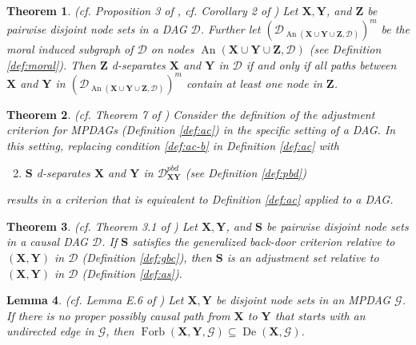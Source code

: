 \documentclass[twoside]{article}
\newtheorem{theorem}{Theorem}
\newtheorem{lemma}[theorem]{Lemma}
\DeclareMathOperator{\An}{An}
\DeclareMathOperator{\De}{De}
\DeclareMathOperator{\Forb}{Forb}
\newcommand{\fb}[2][X,Y]{\Forb(\mb{#1},#2)}
\newcommand{\dpbd}[2][G]{\mathcal{D}_{\mb{#2}}^{pbd}}
\newcommand{\mb}[1]{\mathbf{#1}}
\newcommand{\g}[1][G]{\mathcal{#1}}
\begin{document}


\begin{theorem}
\label{thm:richardson}
{\normalfont (cf. Proposition 3 of \cite{lauritzen1990independence}, cf. Corollary 2 of \cite{richardson2003markov})}
    Let $\mb{X},\mb{Y}$, and $\mb{Z}$ be pairwise disjoint node sets in a DAG $\g[D]$. Further let $(\g[D]_{\An(\mb{X} \cup \mb{Y} \cup \mb{Z},\g[D])})^m$ be the moral induced subgraph of $\g[D]$ on nodes $\An(\mb{X} \cup \mb{Y} \cup \mb{Z},\g[D])$ (see Definition \ref{def:moral}). Then $\mb{Z}$ d-separates $\mb{X}$ and $\mb{Y}$ in $\g[D]$ if and only if all paths between $\mb{X}$ and $\mb{Y}$ in $(\g[D]_{\An(\mb{X} \cup \mb{Y} \cup \mb{Z},\g[D])})^m$ contain at least one node in $\mb{Z}$.
\end{theorem}


\begin{theorem}
\label{thm:ac-alt}
{\normalfont (cf. Theorem 7 of \citealp{perkovic2018complete})}
    Consider the definition of the adjustment criterion for MPDAGs (Definition \ref{def:ac}) in the specific setting of a DAG. In this setting, replacing condition \ref{def:ac-b} in Definition \ref{def:ac} with
    \begin{enumerate}[label=\emph{(\alph*)}]
        \setcounter{enumi}{1}
        \item $\mb{S}$ d-separates $\mb{X}$ and $\mb{Y}$ in $\dpbd{\mb{XY}}$ (see Definition \ref{def:pbd})
    \end{enumerate}
    results in a criterion that is equivalent to Definition \ref{def:ac} applied to a DAG.
\end{theorem} 



\begin{theorem}
\label{thm:gbc-as}
{\normalfont (cf. Theorem 3.1 of \citealp{maathuis2015generalized})}
    Let $\mb{X},\mb{Y}$, and $\mb{S}$ be pairwise disjoint node sets in a causal DAG $\g[D]$. If $\mb{S}$ satisfies the generalized back-door criterion relative to $(\mb{X},\mb{Y})$ in $\g[D]$ (Definition \ref{def:gbc}), then $\mb{S}$ is an adjustment set relative to $(\mb{X},\mb{Y})$ in $\g[D]$ (Definition \ref{def:as}). 
\end{theorem}


\begin{lemma}
\label{lem:henckel-e6}
{\normalfont (cf. Lemma E.6 of \citealp{henckel2022graphical})}
    Let $\mb{X},\mb{Y}$ be disjoint node sets in an MPDAG $\g$. If there is no proper possibly causal path from $\mb{X}$ to $\mb{Y}$ that starts with an undirected edge in $\g$, then $\fb{\g} \subseteq \De(\mb{X}, \g)$. 
\end{lemma}
\end{document}
